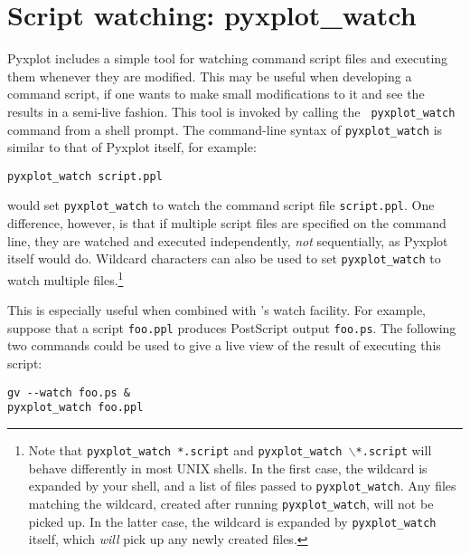 \section{Script watching: pyxplot\_watch}

Pyxplot includes a simple tool for watching command script files and executing
them whenever they are modified. This may be useful when developing a command
script, if one wants to make small modifications to it and see the results in a
semi-live fashion. This tool is invoked by calling the {\tt
pyxplot\_watch} command from a
shell prompt. The command-line syntax of {\tt pyxplot\_watch} is similar to
that of Pyxplot itself, for example:

\begin{verbatim}
pyxplot_watch script.ppl
\end{verbatim}

\noindent would set {\tt pyxplot\_watch} to watch the command script file
{\tt script.ppl}. One difference, however, is that if multiple script files are
specified on the command line, they are watched and executed independently,
\textit{not} sequentially, as Pyxplot itself would do. Wildcard characters can
also be used to set {\tt pyxplot\_watch} to watch multiple
files.\footnote{Note that {\tt pyxplot\_watch *.script} and
{\tt pyxplot\_watch $\backslash$*.script} will behave differently in most
UNIX shells.  In the first case, the wildcard is expanded by your shell, and a
list of files passed to {\tt pyxplot\_watch}. Any files matching the
wildcard, created after running {\tt pyxplot\_watch}, will not be picked up.
In the latter case, the wildcard is expanded by {\tt pyxplot\_watch} itself,
which {\it will} pick up any newly created files.}

This is especially useful when combined with \ghostview's
watch facility. For example, suppose that a script {\tt foo.ppl} produces
PostScript output {\tt foo.ps}. The following two commands could be used to
give a live view of the result of executing this script:

\begin{verbatim}
gv --watch foo.ps &
pyxplot_watch foo.ppl
\end{verbatim}

